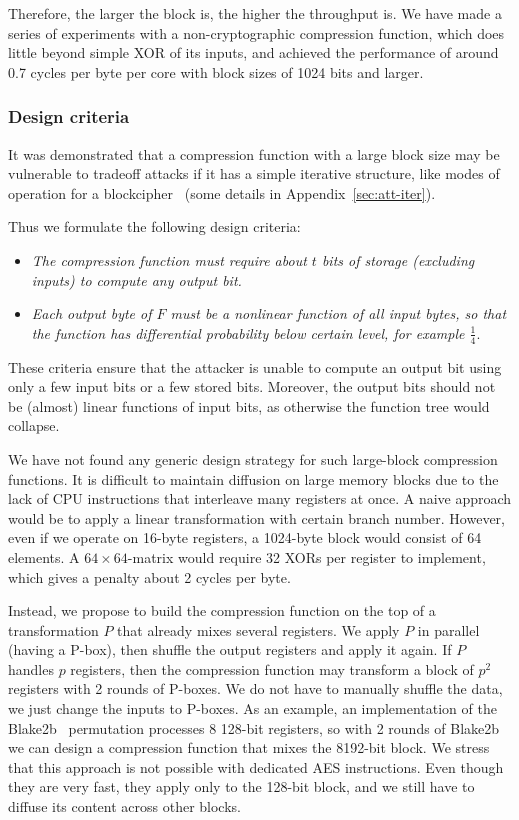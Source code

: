 \documentclass[a4paper]{article}
\begin{document}
Therefore, the larger the block is, the higher the throughput is. We have made a series of experiments with a non-cryptographic compression function, which does little beyond simple XOR of its inputs, and achieved the performance of around 0.7 cycles per byte per core with block sizes of 1024 bits and larger.

\subsubsection{Design criteria}

It was demonstrated that a compression function with a large block size may be vulnerable to tradeoff attacks if it has a simple iterative structure, like modes of operation for a blockcipher~\cite{trade-att} (some details in Appendix~\ref{sec:att-iter}). 

Thus we formulate the following design criteria:
\begin{itemize}
  \item \emph{The compression function must require about $t$ bits of storage (excluding inputs) to compute any output bit.}
  \item \emph{Each output byte of $F$ must be a nonlinear function of all input bytes, so that the function has differential probability below certain level, for example $\frac{1}{4}$}.
\end{itemize}
These criteria ensure that the attacker is unable to compute an output bit using only a few input bits or a few stored bits. Moreover, the output bits should not be (almost) linear functions of input bits, as otherwise the function tree would collapse.

We have not found any generic design strategy for such large-block compression functions. It is difficult to maintain diffusion on large memory blocks due to the lack of CPU instructions that interleave many registers at once. A naive approach would be to apply a linear transformation with certain branch number. However, even if we operate on 16-byte registers, a 1024-byte block would consist of 64 elements. A $64\times 64$-matrix would require 32 XORs per register to implement, which gives a penalty about 2 cycles per byte.

Instead, we propose to build the compression function on the top of a transformation $P$ that already mixes several registers. We apply $P$ in parallel (having a P-box), then shuffle the output registers and apply it again. If $P$ handles $p$ registers, then the compression function may transform a block of $p^2$ registers with 2 rounds of P-boxes. We do not have to manually shuffle the data, we just change the inputs to P-boxes. As an example, an implementation of the Blake2b~\cite{AumassonNWW13} permutation processes 8 128-bit registers, so with 2 rounds of Blake2b we can design
a compression function that mixes the 8192-bit block. We stress that this approach is not possible with dedicated AES instructions. Even though they are very fast, they apply only to the 128-bit block, and we still have to diffuse its content across other blocks.
\end{document}
